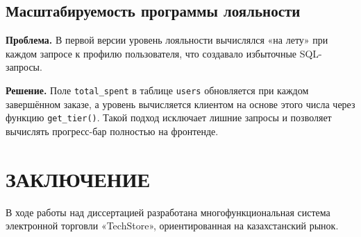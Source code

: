 \documentclass[14pt,a4paper]{extreport}
\begin{document}
\section{Масштабируемость программы лояльности}

\textbf{Проблема.} В первой версии уровень лояльности вычислялся «на лету» при каждом запросе к профилю пользователя, что создавало избыточные SQL-запросы.

\textbf{Решение.} Поле \texttt{total\_spent} в таблице \texttt{users} обновляется при каждом завершённом заказе, а уровень вычисляется клиентом на основе этого числа через функцию \texttt{get\_tier()}. Такой подход исключает лишние запросы и позволяет вычислять прогресс-бар полностью на фронтенде.

\chapter*{ЗАКЛЮЧЕНИЕ}

В ходе работы над диссертацией разработана многофункциональная система электронной торговли «TechStore», ориентированная на казахстанский рынок.
\end{document}
